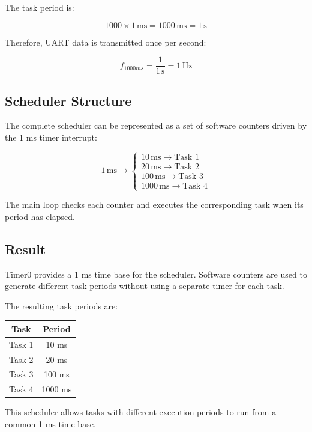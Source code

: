 \documentclass[12pt,a4paper]{article}
\begin{document}
The task period is:

\[
1000\times1\,\mathrm{ms}
=
1000\,\mathrm{ms}
=
1\,\mathrm{s}
\]

Therefore, UART data is transmitted once per second:

\[
f_{1000ms}
=
\frac{1}{1\,\mathrm{s}}
=
1\,\mathrm{Hz}
\]

\subsection{Scheduler Structure}

The complete scheduler can be represented as a set of software
counters driven by the 1 ms timer interrupt:

\[
1\,\mathrm{ms}
\rightarrow
\begin{cases}
10\,\mathrm{ms}\rightarrow\text{Task 1}\\
20\,\mathrm{ms}\rightarrow\text{Task 2}\\
100\,\mathrm{ms}\rightarrow\text{Task 3}\\
1000\,\mathrm{ms}\rightarrow\text{Task 4}
\end{cases}
\]

The main loop checks each counter and executes the corresponding task
when its period has elapsed.

\subsection{Result}

Timer0 provides a 1 ms time base for the scheduler. Software counters
are used to generate different task periods without using a separate
timer for each task.

The resulting task periods are:

\begin{center}
\begin{tabular}{|c|c|}
\hline
\textbf{Task} & \textbf{Period} \\
\hline
Task 1 & 10 ms \\
\hline
Task 2 & 20 ms \\
\hline
Task 3 & 100 ms \\
\hline
Task 4 & 1000 ms \\
\hline
\end{tabular}
\end{center}

This scheduler allows tasks with different execution periods to run
from a common 1 ms time base.
\end{document}
